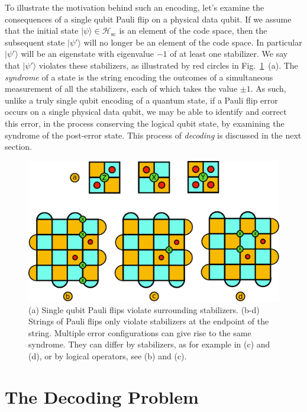 \documentclass[twocolumn,preprintnumbers,amsmath,amssymb,notitlepage,nofootinbib,longbibliography,superscriptaddress,aps,pra,10pt]{revtex4-1}
\begin{document}
        To illustrate the motivation behind such an encoding, let's examine the consequences of a single qubit Pauli flip on a physical data qubit. 
        If we assume that the initial state $|\psi\rangle \in \mathcal{H}_\mathrm{sc}$ is an element of the code space, then the subsequent state $|\psi'\rangle$ will no longer be an element of the code space.
        In particular $|\psi'\rangle$ will be an eigenstate with eigenvalue $-1$ of at least one stabilizer. 
        We say that $|\psi'\rangle$ violates these stabilizers, as illustrated by red circles in Fig.~\ref{f:surface_code_examples}~(a).
        The \textit{syndrome} of a state is the string encoding the outcomes of a simultaneous measurement of all the stabilizers, each of which takes the value $\pm 1$.
        As such, unlike a truly single qubit encoding of a quantum state, if a Pauli flip error occurs on a single physical data qubit, we may be able to identify and correct this error, in the process conserving the logical qubit state, by examining the syndrome of the post-error state. 
        This process of \textit{decoding} is discussed in the next section.

        \begin{figure}
            \centering
            \includegraphics[width=1\linewidth]{surface_code_examples.pdf}
            \caption{(a) Single qubit Pauli flips violate surrounding stabilizers. (b-d) Strings of Pauli flips only violate stabilizers at the endpoint of the string. Multiple error configurations can give rise to the same syndrome. They can differ by stabilizers, as for example in (c) and (d), or by logical operators, see (b) and (c).}\label{f:surface_code_examples}
        \end{figure}


\section{The Decoding Problem}\label{s:the_decoding_problem}
\end{document}
